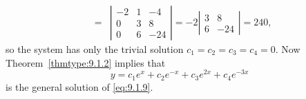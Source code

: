 \begin{examplesolution}
\begin{equation}
\begin{array}{rcl}
                                                                                        & = & \left|\begin{array}{rrr}-2&1&-4\\0&3&8 \\0&6&-24\end{array}\right|= -2\left|\begin{array}{rr}3&8\\6&-24\end{array}\right|=240,
  \end{array}
\end{equation}
so the system has only the trivial solution $c_{1}=c_{2}=c_{3}=c_{4}=0$. Now
Theorem~\ref{thmtype:9.1.2} implies that
\[
  y=c_{1}e^{x}+c_{2}e^{-x}+c_{3}e^{2x}+c_{4}e^{-3x}
\]
is the general solution of \eqref{eq:9.1.9}.
\end{examplesolution}


